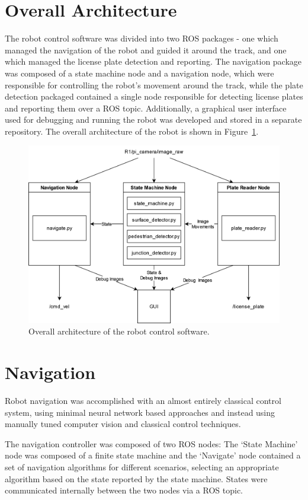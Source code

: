 \documentclass[titlepage, twocolumn]{article}
\begin{document}
\section{Overall Architecture}

    The robot control software was divided into two ROS packages - one which managed the navigation of the robot and guided it around the track, and one which managed the license plate detection and reporting. The navigation package was composed of a state machine node and a navigation node, which were responsible for controlling the robot's movement around the track, while the plate detection packaged contained a single node responsible for detecting license plates and reporting them over a ROS topic. Additionally, a graphical user interface used for debugging and running the robot was developed and stored in a separate repository. The overall architecture of the robot is shown in Figure~\ref{fig:architecture}. 

    \begin{figure}
        \centering
        \includegraphics[width=0.8\linewidth]{architecture.png}
        \caption{Overall architecture of the robot control software.}
        \label{fig:architecture}
    \end{figure}
\section{Navigation}
    Robot navigation was accomplished with an almost entirely classical control system, using minimal neural network based approaches and instead using manually tuned computer vision and classical control techniques. 

    The navigation controller was composed of two ROS nodes: The `State Machine' node was composed of a finite state machine and the `Navigate' node contained a set of navigation algorithms for different scenarios, selecting an appropriate algorithm based on the state reported by the state machine. States were communicated internally between the two nodes via a ROS topic.
    
\end{document}
